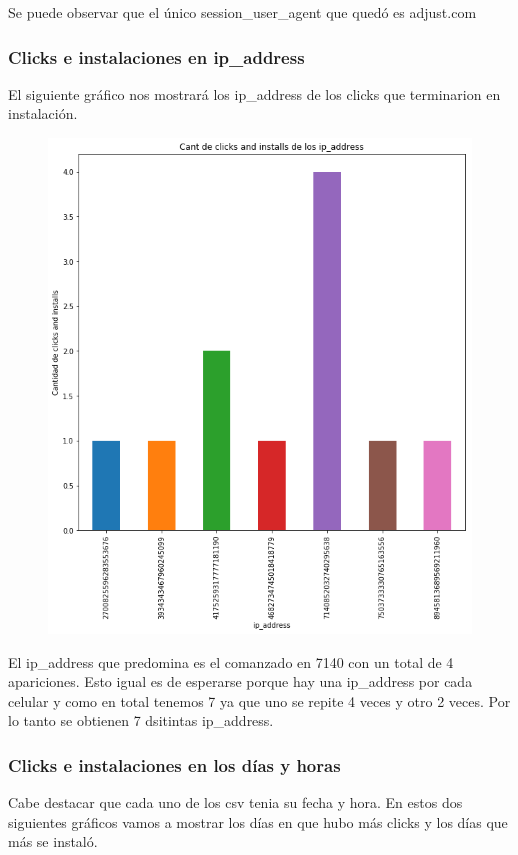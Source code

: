 \documentclass[a4paper, 12pt]{article}
\begin{document}
{{	
	Se puede observar que el único session\_user\_agent que quedó es adjust.com
	
	
	\subsubsection{Clicks e instalaciones en ip\_address}
	El siguiente gráfico nos mostrará los ip\_address de los clicks que terminarion en instalación.
	
	
		\begin{figure}[H]
			\centering
			\includegraphics[scale = 0.5]{images/clicks-installs/ip_address.png}
			\caption{}
		\end{figure}
	

	El ip\_address que predomina es el comanzado en 7140 con un total de 4 apariciones. Esto igual es de esperarse porque hay una ip\_address por cada celular y como en total tenemos 7 ya que uno se repite 4 veces y otro 2 veces. Por lo tanto se obtienen 7 dsitintas ip\_address.
	
	\subsubsection{Clicks e instalaciones en los días y horas}
	Cabe destacar que cada uno de los csv tenia su fecha y hora. En estos dos siguientes gráficos vamos a mostrar los días en que hubo más clicks y los días que más se instaló.
	
}}
\end{document}
